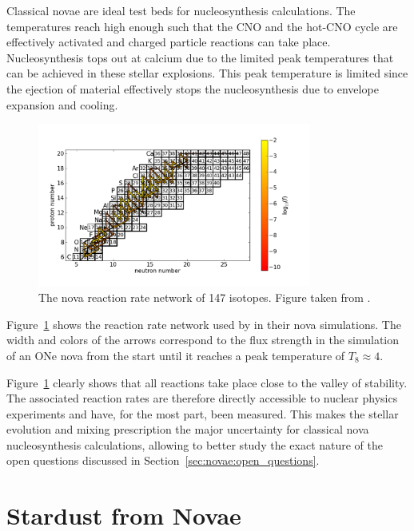 Classical novae are ideal test beds for nucleosynthesis calculations. The temperatures reach high enough such that the CNO and the hot-CNO cycle are effectively activated and charged particle reactions can take place. Nucleosynthesis tops out at calcium due to the limited peak temperatures that can be achieved in these stellar explosions. This peak temperature is limited since the ejection of material effectively stops the nucleosynthesis due to envelope expansion and cooling.
\begin{figure}[tb]
    \centering
    \includegraphics[width=0.8\textwidth]{graphics/novae/nova_reac_net}
    \caption{The nova reaction rate network of 147 isotopes. Figure taken from \citet{denissenkov14}.}
    \label{fig:novae_reaction_rate_network_denissenkov}
\end{figure}
Figure~\ref{fig:novae_reaction_rate_network_denissenkov} shows the reaction rate network used by \citet{denissenkov14} in their nova simulations. The width and colors of the arrows correspond to the flux strength in the simulation of an ONe nova from the start until it reaches a peak temperature of $T_8 \approx 4$.

Figure~\ref{fig:novae_reaction_rate_network_denissenkov} clearly shows that all reactions take place close to the valley of stability. The associated reaction rates are therefore directly accessible to nuclear physics experiments and have, for the most part, been measured. This makes the stellar evolution and mixing prescription the major uncertainty for classical nova nucleosynthesis calculations, allowing to better study the exact nature of the open questions discussed in Section~\ref{sec:novae:open_questions}.


\section{Stardust from Novae}

